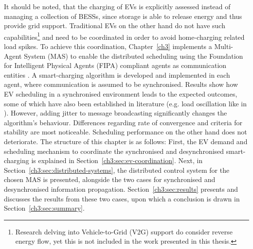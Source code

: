 It should be noted, that the charging of EVs is explicitly assessed instead of managing a collection of BESSs, since storage is able to release energy and thus provide grid support.
Traditional EVs on the other hand do not have such capabilities\footnote{Research delving into Vehicle-to-Grid (V2G) support do consider reverse energy flow, yet this is not included in the work presented in this thesis.} and need to be coordinated in order to avoid home-charging related load spikes.
To achieve this coordination, Chapter~\ref{ch3} implements a Multi-Agent System (MAS) to enable the distributed scheduling using the Foundation for Intelligent Physical Agents (FIPA) compliant agents as communication entities \cite{FIPA-website}.
A smart-charging algorithm is developed and implemented in each agent, where communication is assumed to be synchronised.
Results show how EV scheduling in a synchronised environment leads to the expected outcomes, some of which have also been established in literature (e.g. load oscillation like in \cite{Karfopoulos2013}).
However, adding jitter to message broadcasting significantly changes the algorithm's behaviour.
Differences regarding rate of convergence and criteria for stability are most noticeable.
Scheduling performance on the other hand does not deteriorate.
The structure of this chapter is as follows:
First, the EV demand and scheduling mechanism to coordinate the synchronised and desynchronised smart-charging is explained in Section~\ref{ch3:sec:ev-coordination}.
Next, in Section~\ref{ch3:sec:distributed-systems}, the distributed control system for the chosen MAS is presented, alongside the two cases for synchronised and desynchronised information propagation.
Section~\ref{ch3:sec:results} presents and discusses the results from these two cases, upon which a conclusion is drawn in Section~\ref{ch3:sec:summary}.
